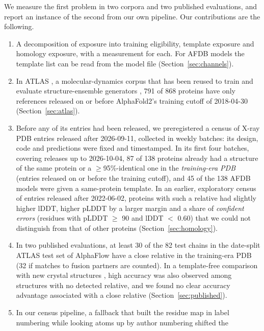 \documentclass{article}
\begin{document}
We measure the first problem in two corpora and two published evaluations,
and report an instance of the second from our own pipeline. Our contributions are the following.
\begin{enumerate}\setlength{\itemsep}{1pt}
\item A decomposition of exposure into training eligibility, template
      exposure and homology exposure, with a measurement for each. For AFDB
      models the template list can be read from the model file
      (Section~\ref{sec:channels}).
\item In ATLAS \citep{vandermeersche2024}, a molecular-dynamics corpus that
      has been reused to train and evaluate structure-ensemble generators
      \citep{jing2024alphaflow}, 791 of 868 proteins have only references
      released on or before AlphaFold2's training cutoff of 2018-04-30
      (Section~\ref{sec:atlas}).
\item Before any of its entries had been released, we preregistered a
      census of X-ray PDB entries released after 2026-09-11, collected in
      weekly batches: its design, code and predictions were fixed and
      timestamped. In its first four batches, covering releases up to
      2026-10-04, 87 of 138 proteins already had a structure of the same
      protein or a $\ge$95\%-identical one in the \emph{training-era PDB}
      (entries released on or before the training cutoff), and 45 of the 138
      AFDB models were given a same-protein template. In an earlier,
      exploratory census of entries released after 2022-06-02, proteins with
      such a relative had slightly higher lDDT, higher pLDDT by a larger
      margin and a share of \emph{confident errors} (residues with pLDDT
      $\ge$ 90 and lDDT $<$ 0.60) that we could not distinguish from that of
      other proteins (Section~\ref{sec:homology}).
\item In two published evaluations, at least 30 of the 82 test chains in
      the date-split ATLAS test set of AlphaFlow \citep{jing2024alphaflow}
      have a close relative in the training-era PDB (32 if matches to fusion
      partners are counted). In a template-free comparison with new crystal
      structures \citep{terwilliger2024}, high accuracy was also observed
      among structures with no detected relative, and we found no clear
      accuracy advantage associated with a close relative
      (Section~\ref{sec:published}).
\item In our census pipeline, a fallback that built the residue map in
      label numbering while looking atoms up by author numbering shifted the

\end{enumerate}
\end{document}
